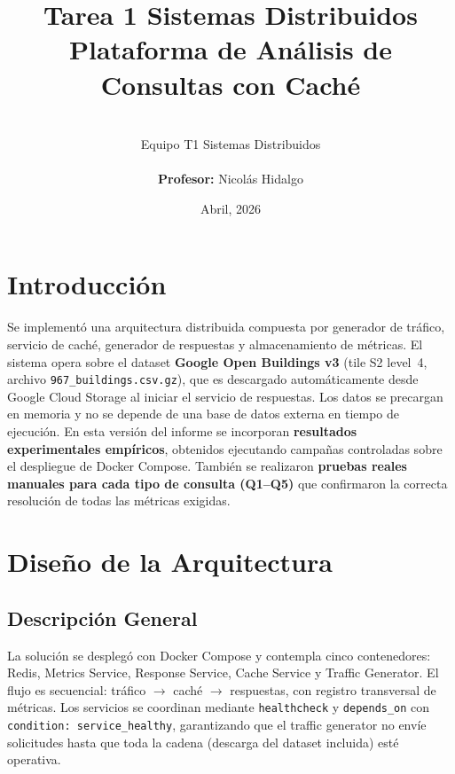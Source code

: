 \documentclass[letter,12pt]{article}
\begin{document}
\title{\Huge{Tarea 1 Sistemas Distribuidos} \\
  \large Plataforma de Análisis de Consultas con Caché}
\author{\\Equipo T1 Sistemas Distribuidos\\\\ \textbf{Profesor: } Nicolás Hidalgo}
\date{Abril, 2026}
\maketitle

\tableofcontents

\newpage

\section{Introducción}
Se implementó una arquitectura distribuida compuesta por generador de tráfico, servicio de caché, generador de respuestas y almacenamiento de métricas. El sistema opera sobre el dataset \textbf{Google Open Buildings v3} (tile S2 level~4, archivo \texttt{967\_buildings.csv.gz}), que es descargado automáticamente desde Google Cloud Storage al iniciar el servicio de respuestas. Los datos se precargan en memoria y no se depende de una base de datos externa en tiempo de ejecución. En esta versión del informe se incorporan \textbf{resultados experimentales empíricos}, obtenidos ejecutando campañas controladas sobre el despliegue de Docker Compose. También se realizaron \textbf{pruebas reales manuales para cada tipo de consulta (Q1--Q5)} que confirmaron la correcta resolución de todas las métricas exigidas.

\section{Diseño de la Arquitectura}
\subsection{Descripción General}
La solución se desplegó con Docker Compose y contempla cinco contenedores: Redis, Metrics Service, Response Service, Cache Service y Traffic Generator. El flujo es secuencial: tráfico $\rightarrow$ caché $\rightarrow$ respuestas, con registro transversal de métricas. Los servicios se coordinan mediante \texttt{healthcheck} y \texttt{depends\_on} con \texttt{condition: service\_healthy}, garantizando que el traffic generator no envíe solicitudes hasta que toda la cadena (descarga del dataset incluida) esté operativa.
\end{document}
